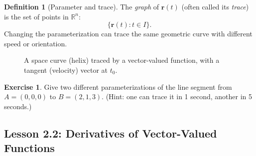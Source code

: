 \documentclass[12pt]{article}
\numberwithin{equation}{section}
\newcommand{\RR}{\mathbb{R}}
\newcommand{\vect}[1]{\boldsymbol{#1}}   %
\theoremstyle{plain}
\theoremstyle{definition}
\newtheorem{definition}[theorem]{Definition}
\newtheorem{exercise}[theorem]{Exercise}
\theoremstyle{remark}
\begin{document}
\begin{definition}[Parameter and trace]
The \emph{graph} of $\vect r(t)$ (often called its \emph{trace}) is the set of points in $\RR^n$:
\[
\{\vect r(t): t\in I\}.
\]
Changing the parameterization can trace the same geometric curve with different speed or orientation.
\end{definition}

\begin{figure}[H]
\centering
{}
\caption{A space curve (helix) traced by a vector-valued function, with a tangent (velocity) vector at $t_0$.}
\label{fig:helix}
\end{figure}

\begin{exercise}
Give two different parameterizations of the line segment from $A=(0,0,0)$ to $B=(2,1,3)$. (Hint: one can trace it in 1 second, another in 5 seconds.)
\end{exercise}


\subsection{Lesson 2.2: Derivatives of Vector-Valued Functions}
\end{document}
